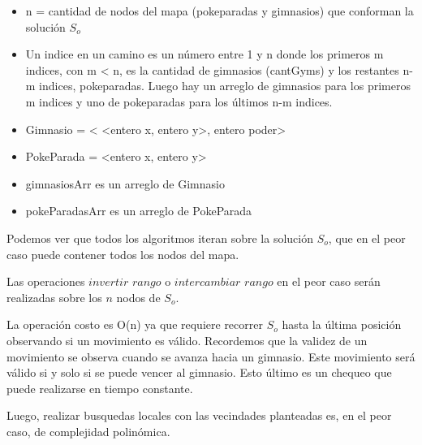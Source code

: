 \begin{algorithm}[H]


\end{algorithm}

\begin{itemize}
\item n = cantidad de nodos del mapa (pokeparadas y gimnasios) que conforman la solución $S_o$
\item Un indice en un camino es un número entre 1 y n donde los primeros m indices, con m < n, es la cantidad de gimnasios (cantGyms) y los restantes n-m indices,  pokeparadas. Luego hay un arreglo de gimnasios para los primeros m indices y uno de pokeparadas para los últimos n-m indices.
\item Gimnasio = < <entero x, entero y>, entero poder>
\item PokeParada = <entero x, entero y>
\item gimnasiosArr es un arreglo de Gimnasio
\item pokeParadasArr es un arreglo de PokeParada
\end{itemize}

Podemos ver que todos los algoritmos iteran sobre la solución $S_o$, que en el peor caso puede contener todos los nodos del mapa. 

Las operaciones $invertir$ $rango$ o $intercambiar$ $rango$ en el peor caso serán realizadas sobre los $n$ nodos de $S_o$.

La operación costo es O(n) ya que requiere recorrer $S_o$ hasta la última posición observando si un movimiento es válido. Recordemos que la validez de un movimiento se observa cuando se avanza hacia un gimnasio. Este movimiento será válido si y solo si se puede vencer al gimnasio. Esto último es un chequeo que puede realizarse en tiempo constante.  

Luego, realizar busquedas locales con las vecindades planteadas es, en el peor caso, de complejidad polinómica. 


